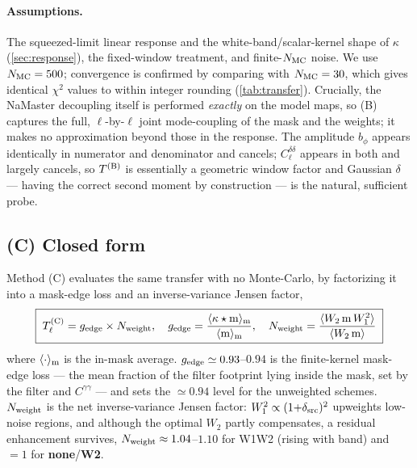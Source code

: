 \documentclass[11pt]{article}
\newcommand{\Wone}{W_1}
\newcommand{\Wtwo}{W_2}
\newcommand{\dt}{\delta}
\begin{document}
\paragraph{Assumptions.}
The squeezed-limit linear response and the white-band/scalar-kernel shape of
$\kappa$ (\cref{sec:response}), the fixed-window treatment, and finite-$N_{\rm
MC}$ noise. We use $N_{\rm MC}=500$; convergence is confirmed by comparing with
$N_{\rm MC}=30$, which gives identical $\chi^2$ values to within integer rounding
(\cref{tab:transfer}). Crucially, the NaMaster decoupling itself is performed \emph{exactly}
on the model maps, so (B) captures the full, $\ell$-by-$\ell$ joint mode-coupling
of the mask and the weights; it makes no approximation beyond those in the
response. The amplitude $b_\phi$ appears identically in numerator and denominator
and cancels; $C^{\dt\dt}_\ell$ appears in both and largely cancels, so $T^{\rm
(B)}$ is essentially a geometric window factor and Gaussian $\dt$ --- having the
correct second moment by construction --- is the natural, sufficient probe.

\subsection{(C) Closed form}\label{sec:TC}

Method (C) evaluates the same transfer with no Monte-Carlo, by factorizing it
into a mask-edge loss and an inverse-variance Jensen factor,
\begin{equation}
\boxed{\;T_\ell^{\rm (C)}=g_{\rm edge}\times N_{\rm weight},\quad
g_{\rm edge}=\frac{\langle\kappa\star{\rm m}\rangle_{\rm m}}{\langle{\rm m}\rangle_{\rm m}},\quad
N_{\rm weight}=\frac{\langle\Wtwo\,{\rm m}\,\Wone^2\rangle}{\langle\Wtwo\,{\rm m}\rangle}\;}
\label{eq:TC}
\end{equation}
where $\langle\cdot\rangle_{\rm m}$ is the in-mask average.
$g_{\rm edge}\simeq0.93$--$0.94$ is the finite-kernel mask-edge loss --- the
mean fraction of the filter footprint lying inside the mask, set by the filter
and $C^{\gamma\gamma}$ --- and sets the $\simeq0.94$ level for the unweighted
schemes. $N_{\rm weight}$ is the net inverse-variance Jensen factor:
$\Wone^2\propto(1{+}\delta_{\rm src})^2$ upweights low-noise regions, and
although the optimal $\Wtwo$ partly compensates, a residual enhancement survives,
$N_{\rm weight}\approx1.04$--$1.10$ for W1W2 (rising with band) and $=1$ for
\textbf{none}/\textbf{W2}.
\end{document}
